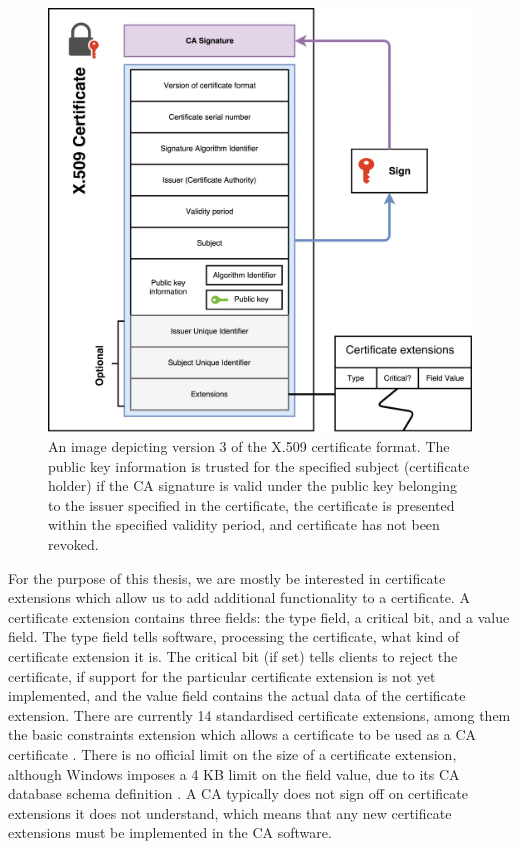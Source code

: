 \documentclass{style/kththesis}
\begin{document}
\begin{figure}
    \centering
    \includegraphics[width=\textwidth]{figures/x509v3}
    \caption{An image depicting version 3 of the X.509 certificate format. The public key information is trusted for the specified subject (certificate holder) if the CA signature is valid under the public key belonging to the issuer specified in the certificate, the certificate is presented within the specified validity period, and certificate has not been revoked.}
    \label{fig:x509v3}
\end{figure}

For the purpose of this thesis, we are mostly be interested in certificate extensions which allow us to add additional functionality to a certificate. A certificate extension contains three fields: the type field, a critical bit, and a value field. The type field tells software, processing the certificate, what kind of certificate extension it is. The critical bit (if set) tells clients to reject the certificate, if support for the particular certificate extension is not yet implemented, and the value field contains the actual data of the certificate extension. There are currently 14 standardised certificate extensions, among them the basic constraints extension which allows a certificate to be used as a CA certificate \cite{Viega02}. There is no official limit on the size of a certificate extension, although Windows imposes a 4 KB limit on the field value, due to its CA database schema definition \cite{Stephens11}. A CA typically does not sign off on certificate extensions it does not understand, which means that any new certificate extensions must be implemented in the CA software.
\end{document}
